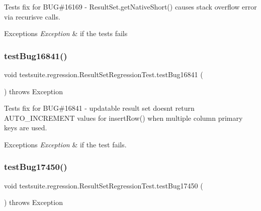 Tests fix for B\+UG\#16169 -\/ Result\+Set.\+get\+Native\+Short() causes stack overflow error via recurisve calls.


\begin{DoxyExceptions}{Exceptions}
{\em Exception} & if the tests fails \\
\hline
\end{DoxyExceptions}
\mbox{\label{classtestsuite_1_1regression_1_1_result_set_regression_test_ad9be7ab34170c6249e0de5467279a59c}} 
\subsubsection{\texorpdfstring{test\+Bug16841()}{testBug16841()}}
{\footnotesize\ttfamily void testsuite.\+regression.\+Result\+Set\+Regression\+Test.\+test\+Bug16841 (\begin{DoxyParamCaption}{ }\end{DoxyParamCaption}) throws Exception}

Tests fix for B\+UG\#16841 -\/ updatable result set doesn\textquotesingle{}t return A\+U\+T\+O\+\_\+\+I\+N\+C\+R\+E\+M\+E\+NT values for insert\+Row() when multiple column primary keys are used.


\begin{DoxyExceptions}{Exceptions}
{\em Exception} & if the test fails. \\
\hline
\end{DoxyExceptions}
\mbox{\label{classtestsuite_1_1regression_1_1_result_set_regression_test_a3f4bf90b85397d484d4ca1e59e7700da}} 
\subsubsection{\texorpdfstring{test\+Bug17450()}{testBug17450()}}
{\footnotesize\ttfamily void testsuite.\+regression.\+Result\+Set\+Regression\+Test.\+test\+Bug17450 (\begin{DoxyParamCaption}{ }\end{DoxyParamCaption}) throws Exception}

